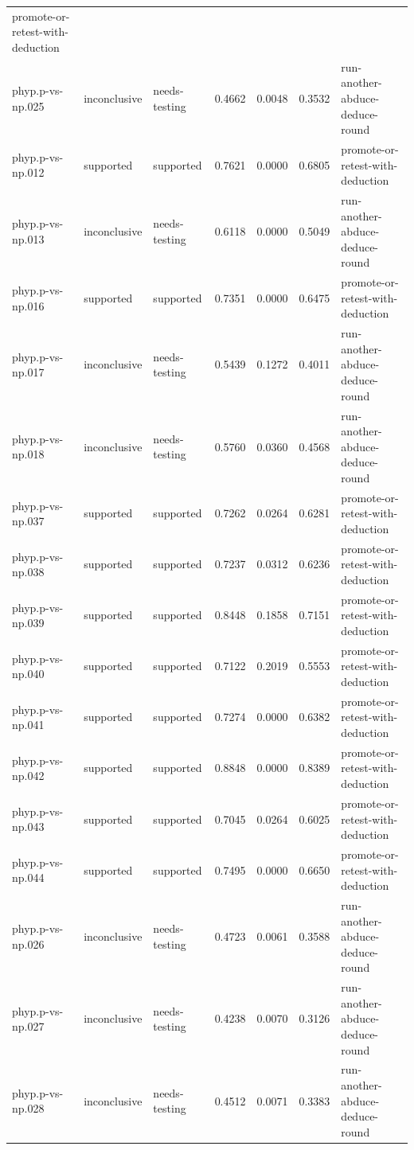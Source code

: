 \documentclass[
]{article}
\begin{document}
{\begin{longtable}[]{@{}lllllll@{}}
promote-or-retest-with-deduction \\
phyp.p-vs-np.025 & inconclusive & needs-testing & 0.4662 & 0.0048 &
0.3532 & run-another-abduce-deduce-round \\
phyp.p-vs-np.012 & supported & supported & 0.7621 & 0.0000 & 0.6805 &
promote-or-retest-with-deduction \\
phyp.p-vs-np.013 & inconclusive & needs-testing & 0.6118 & 0.0000 &
0.5049 & run-another-abduce-deduce-round \\
phyp.p-vs-np.016 & supported & supported & 0.7351 & 0.0000 & 0.6475 &
promote-or-retest-with-deduction \\
phyp.p-vs-np.017 & inconclusive & needs-testing & 0.5439 & 0.1272 &
0.4011 & run-another-abduce-deduce-round \\
phyp.p-vs-np.018 & inconclusive & needs-testing & 0.5760 & 0.0360 &
0.4568 & run-another-abduce-deduce-round \\
phyp.p-vs-np.037 & supported & supported & 0.7262 & 0.0264 & 0.6281 &
promote-or-retest-with-deduction \\
phyp.p-vs-np.038 & supported & supported & 0.7237 & 0.0312 & 0.6236 &
promote-or-retest-with-deduction \\
phyp.p-vs-np.039 & supported & supported & 0.8448 & 0.1858 & 0.7151 &
promote-or-retest-with-deduction \\
phyp.p-vs-np.040 & supported & supported & 0.7122 & 0.2019 & 0.5553 &
promote-or-retest-with-deduction \\
phyp.p-vs-np.041 & supported & supported & 0.7274 & 0.0000 & 0.6382 &
promote-or-retest-with-deduction \\
phyp.p-vs-np.042 & supported & supported & 0.8848 & 0.0000 & 0.8389 &
promote-or-retest-with-deduction \\
phyp.p-vs-np.043 & supported & supported & 0.7045 & 0.0264 & 0.6025 &
promote-or-retest-with-deduction \\
phyp.p-vs-np.044 & supported & supported & 0.7495 & 0.0000 & 0.6650 &
promote-or-retest-with-deduction \\
phyp.p-vs-np.026 & inconclusive & needs-testing & 0.4723 & 0.0061 &
0.3588 & run-another-abduce-deduce-round \\
phyp.p-vs-np.027 & inconclusive & needs-testing & 0.4238 & 0.0070 &
0.3126 & run-another-abduce-deduce-round \\
phyp.p-vs-np.028 & inconclusive & needs-testing & 0.4512 & 0.0071 &
0.3383 & run-another-abduce-deduce-round \\

\end{longtable}}
\end{document}

